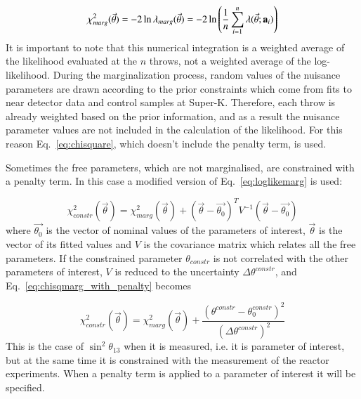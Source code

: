 \begin{equation} \label{eq:loglikemarg}
\chi^2_{marg} (\vec{\theta}) = - 2  \ln \lambda_{marg} (\vec{\theta})  = -2 \ln \left(\frac{1}{n} \sum_{i=1}^{n} 
\lambda (\vec{\theta}; {\bf a}_i)  \right) 
\end{equation}
It is important to note that this numerical integration is a weighted average of the likelihood evaluated at the $n$ throws, 
not a weighted average of the log-likelihood.
During the marginalization process, random values of the nuisance parameters are drawn according to the prior constraints which come from fits to near detector data and control samples at Super-K. Therefore, each throw is already weighted based on the prior information, and as a result the nuisance parameter values are not included in the calculation of the likelihood.
%
%
For this reason Eq.~\ref{eq:chisquare}, which doesn't include the penalty term, is used.

Sometimes the free parameters, which are not marginalised, 
are constrained with a penalty term.
In this case a modified version of Eq.~\ref{eq:loglikemarg} is used:

\begin{equation} \label{eq:chisqmarg_with_penalty}
\chi^2_{constr} (\vec{\theta}) = \chi^2_{marg}(\vec{\theta}) + (\vec{\theta} - \vec{\theta_0})^T V^{-1} (\vec{\theta} - \vec{\theta_0}) 
\end{equation}
where $\vec{\theta_0}$ is the vector of nominal values of the parameters of interest,
$\vec{\theta}$ is the vector of its fitted values 
and $V$ is the covariance matrix which relates all the free parameters.
If the constrained parameter $\theta_{constr}$ is not correlated with the other parameters of interest,
$V$ is reduced to the uncertainty $\Delta \theta^{constr}$,
and Eq.~\ref{eq:chisqmarg_with_penalty} becomes

\begin{equation} \label{eq:chisqmarg_with_penalty_uncorr}
\chi^2_{constr} (\vec{\theta}) = \chi^2_{marg}(\vec{\theta}) + \frac{ (\theta^{constr} - \theta^{constr}_0)^2 }{(\Delta \theta^{constr})^2}
\end{equation}
This is the case of $\sin^2 \theta_{13}$ when it is measured, i.e. it is parameter of interest,
but at the same time it is constrained with the measurement of the reactor experiments.
When a penalty term is applied to a parameter of interest it will be specified.

